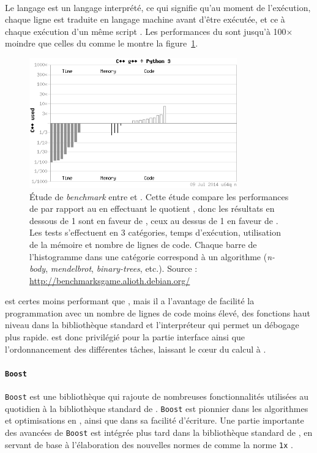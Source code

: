 			\paragraph{\Python}
Le langage \Python{} est un langage interprété, ce qui signifie qu'au moment de l'exécution, chaque ligne est traduite en langage machine avant d'être exécutée, et ce à chaque exécution d'un même script \Python. Les performances du \Python{} sont jusqu'à 100$\times$ moindre que celles du \Cpp{} comme le montre la figure~\ref{fig:cpp-py}.
	\begin{figure}
		\centering
		\includegraphics[width=0.8\textwidth]{img/cpp-py.png}
		\caption[\emph{Benchmark} entre \Cpp{} et \Python]{Étude de \emph{benchmark} entre \Cpp{} et \Python{}. Cette étude compare les performances de \Python{} par rapport au \Cpp{} en effectuant le quotient , donc les résultats en dessous de 1 sont en faveur de \Cpp{}, ceux au dessus de 1 en faveur de \Python{}. Les tests s'effectuent en 3 catégories, temps d'exécution, utilisation de la mémoire et nombre de lignes de code. Chaque barre de l'histogramme dans une catégorie correspond à un algorithme (\emph{n-body}, \emph{mendelbrot}, \emph{binary-trees}, etc.). Source : \url{http://benchmarksgame.alioth.debian.org/}}
		\label{fig:cpp-py}
	\end{figure}
\Python{} est certes moins performant que \Cpp{}, mais il a l'avantage de facilité la programmation avec un nombre de lignes de code moins élevé, des fonctions haut niveau dans la bibliothèque standard et l'interpréteur qui permet un débogage plus rapide. \Python{} est donc privilégié pour la partie interface ainsi que l'ordonnancement des différentes tâches, laissant le cœur du calcul à \Cpp.

			\paragraph{\texttt{Boost}}
\texttt{Boost} est une bibliothèque \Cpp{} qui rajoute de nombreuses fonctionnalités utilisées au quotidien à la bibliothèque standard de \Cpp. \texttt{Boost} est pionnier dans les algorithmes et optimisations en \Cpp, ainsi que dans sa facilité d'écriture. Une partie importante des avancées de \texttt{Boost} est intégrée plus tard dans la bibliothèque standard de \Cpp{}, en servant de base à l'élaboration des nouvelles normes de \Cpp{} comme la norme \Cpp \texttt{1x} \cite{BOOST}.

